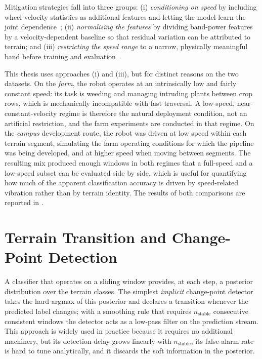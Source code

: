 Mitigation strategies fall into three groups: (i) \emph{conditioning on speed} by including wheel-velocity statistics as additional features and letting the model learn the joint dependence~\cite{Ojeda2006}; (ii) \emph{normalising the features} by dividing band-power features by a velocity-dependent baseline so that residual variation can be attributed to terrain; and (iii) \emph{restricting the speed range} to a narrow, physically meaningful band before training and evaluation~\cite{Bermudez2012}.

This thesis uses approaches (i) and (iii), but for distinct reasons on the two datasets. On the \emph{farm}, the robot operates at an intrinsically low and fairly constant speed: its task is weeding and managing intruding plants between crop rows, which is mechanically incompatible with fast traversal. A low-speed, near-constant-velocity regime is therefore the natural deployment condition, not an artificial restriction, and the farm experiments are conducted in that regime. On the \emph{campus} development route, the robot was driven at low speed within each terrain segment, simulating the farm operating conditions for which the pipeline was being developed, and at higher speed when moving between segments. The resulting mix produced enough windows in both regimes that a full-speed and a low-speed subset can be evaluated side by side, which is useful for quantifying how much of the apparent classification accuracy is driven by speed-related vibration rather than by terrain identity. The results of both comparisons are reported in .

\section{Terrain Transition and Change-Point Detection}
\label{sec:bg-transition}

A classifier that operates on a sliding window provides, at each step, a posterior distribution over the terrain classes. The simplest \emph{implicit} change-point detector takes the hard argmax of this posterior and declares a transition whenever the predicted label changes; with a smoothing rule that requires $n_{\text{stable}}$ consecutive consistent windows the detector acts as a low-pass filter on the prediction stream. This approach is widely used in practice because it requires no additional machinery, but its detection delay grows linearly with $n_{\text{stable}}$, its false-alarm rate is hard to tune analytically, and it discards the soft information in the posterior.

